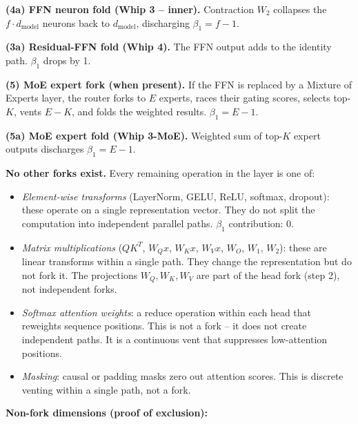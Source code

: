 \documentclass[
  11pt,
]{article}
\providecommand{\tightlist}{%
  \setlength{\itemsep}{0pt}\setlength{\parskip}{0pt}}
\begin{document}
\textbf{(4a) FFN neuron fold (Whip 3 -- inner).} Contraction \(W_2\)
collapses the \(f \cdot d_{\text{model}}\) neurons back to
\(d_{\text{model}}\), discharging \(\beta_1 = f - 1\).

\textbf{(3a) Residual-FFN fold (Whip 4).} The FFN output adds to the
identity path. \(\beta_1\) drops by 1.

\textbf{(5) MoE expert fork (when present).} If the FFN is replaced by a
Mixture of Experts layer, the router forks to \(E\) experts, races their
gating scores, selects top-\(K\), vents \(E - K\), and folds the
weighted results. \(\beta_1 = E - 1\).

\textbf{(5a) MoE expert fold (Whip 3-MoE).} Weighted sum of top-\(K\)
expert outputs discharges \(\beta_1 = E - 1\).

\textbf{No other forks exist.} Every remaining operation in the layer is
one of:

\begin{itemize}
\tightlist
\item
  \emph{Element-wise transforms} (LayerNorm, GELU, ReLU, softmax,
  dropout): these operate on a single representation vector. They do not
  split the computation into independent parallel paths. \(\beta_1\)
  contribution: 0.
\item
  \emph{Matrix multiplications} (\(QK^T\), \(W_Q x\), \(W_K x\),
  \(W_V x\), \(W_O\), \(W_1\), \(W_2\)): these are linear transforms
  within a single path. They change the representation but do not fork
  it. The projections \(W_Q, W_K, W_V\) are part of the head fork (step
  2), not independent forks.
\item
  \emph{Softmax attention weights}: a reduce operation within each head
  that reweights sequence positions. This is not a fork -- it does not
  create independent paths. It is a continuous vent that suppresses
  low-attention positions.
\item
  \emph{Masking}: causal or padding masks zero out attention scores.
  This is discrete venting within a single path, not a fork.
\end{itemize}

\textbf{Non-fork dimensions (proof of exclusion):}
\end{document}
